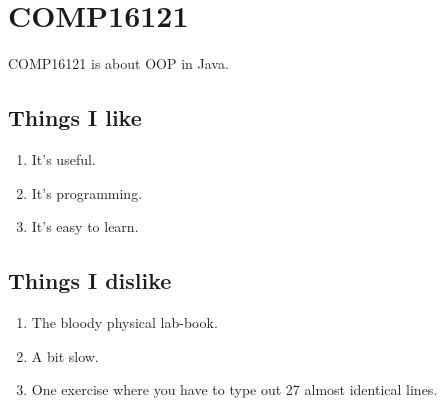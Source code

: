 \documentclass[a4paper]{article}
\begin{document}
\section{COMP16121}
COMP16121 is about OOP in Java.
\subsection{Things I like}
\begin{enumerate}
\item{It's useful.}
\item{It's programming.}
\item{It's easy to learn.}
\end{enumerate}
\subsection{Things I dislike}
\begin{enumerate}
\item{The bloody physical lab-book.}
\item{A bit slow.}
\item{One exercise where you have to type out 27 almost identical lines.}
\end{enumerate}
\end{document}
